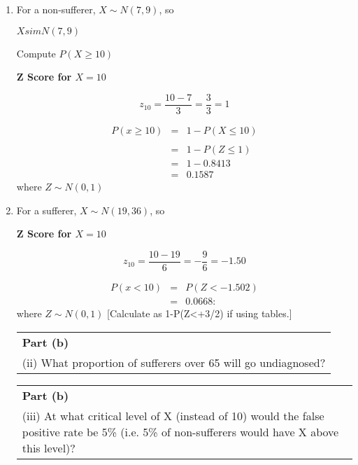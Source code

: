 \documentclass[a4paper,12pt]{article}
\begin{document}
\begin{enumerate}
\item For a non-sufferer, $X\sim N(7,9)$, so


$X sim N(7,9)$

Compute $P(X \geq 10)$

\begin{framed}

\noindent \textbf{Z Score for $X = 10$}

\[z_{10}  = \frac{10-7}{ 3}  = \frac{3}{3} = 1\]
\end{framed}
\begin{eqnarray*}
P(x \geq 10 ) &=&  1- P(X \leq 10) \\
\\ &=&  1 - P(Z \leq 1)
\\ &=& 1 - 0.8413
\\ &=& 0.1587
\end{eqnarray*}
where $Z\sim N(0,1)$
\item For a sufferer, $X\sim N(19,36)$, so


\begin{framed}

\noindent \textbf{Z Score for $X = 10$}

\[z_{10}  = \frac{10-19}{ 6}  = -\frac{9}{6} = -1.50\]
\end{framed}

\begin{eqnarray*}
P(x<10) 
&=& P(Z < -1.502 )\\ &=& 0.0668:
\end{eqnarray*}
where $Z\sim N(0,1)$
[Calculate as 1-P(Z<+3/2) if using tables.]
\begin{table}[ht!]
     \centering
     \begin{tabular}{|p{15cm}|}
     \hline        
 \noindent \textbf{Part (b)}\\
\noindent (ii) What proportion of sufferers over 65 will go undiagnosed?
\\ \hline
 \end{tabular}
\end{table}
\begin{table}[ht!]
     \centering
     \begin{tabular}{|p{15cm}|}
     \hline        
 \noindent \textbf{Part (b)}\\
(iii) At what critical level of X (instead of 10) would the false positive rate be 5\% (i.e. 5\% of non-sufferers would have X above this level)?


\end{tabular}
\end{table}
\end{enumerate}
\end{document}
